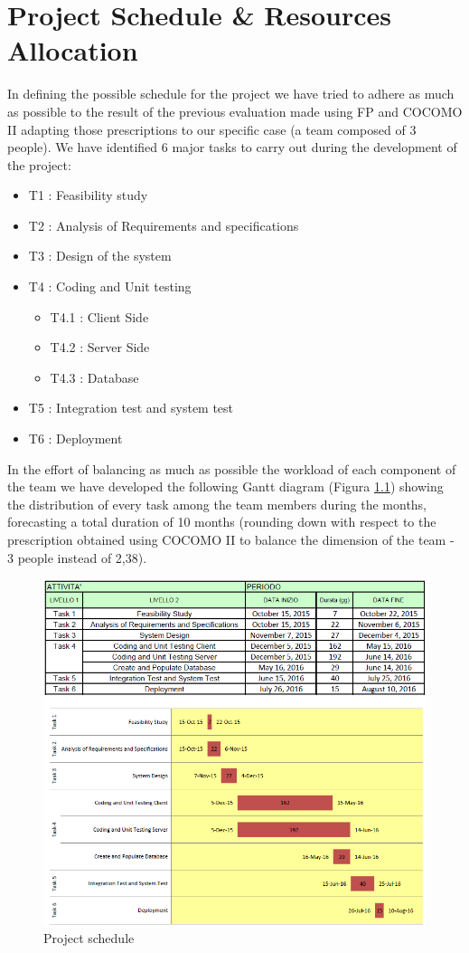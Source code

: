 \chapter{Project Schedule \& Resources Allocation} \label{chap4}
In defining the possible schedule for the project we have tried to adhere as much as possible to the result of the previous evaluation made using FP and COCOMO II adapting those prescriptions to our specific case (a team composed of 3 people).
We have identified 6 major tasks to carry out during the development of the project:
\begin{itemize}
	\item T1 : Feasibility study
	\item T2 : Analysis of Requirements and specifications
	\item T3 : Design of the system
	\item T4 : Coding and Unit testing
	\begin{itemize}
		\item T4.1 : Client Side
		\item T4.2 : Server Side
		\item T4.3 : Database
	\end{itemize}
	\item T5 : Integration test and system test
	\item T6 : Deployment
\end{itemize}
In the effort of balancing as much as possible the workload of each component of the team we have developed the following Gantt diagram (Figura \ref{fig:scheduele}) showing the distribution of every task among the team members during the months, forecasting a total duration of 10 months (rounding down with respect to the prescription obtained using COCOMO II to balance the dimension of the team - 3 people instead of 2,38).

\begin{figure}[!htbp]
\centering
\includegraphics[width=\textwidth]{cpt/img/Schedule}
\caption{Project schedule}
\label{fig:scheduele}
\end{figure}
\clearpage

